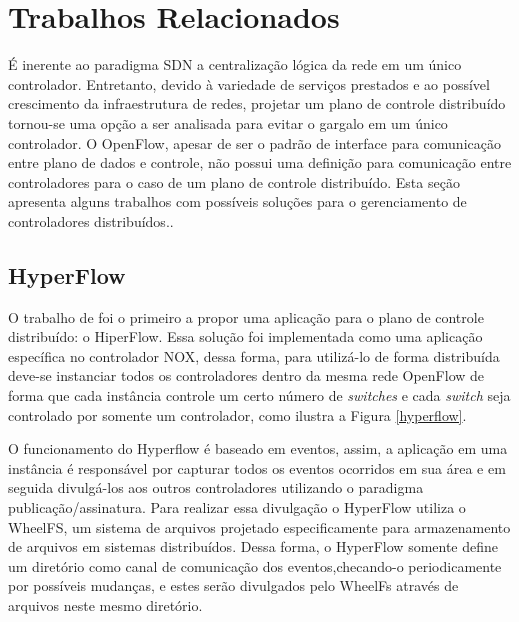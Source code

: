 \chapter{Trabalhos Relacionados}

É inerente ao paradigma SDN a centralização lógica da rede em um único controlador. Entretanto, devido à variedade de serviços prestados e ao possível crescimento da infraestrutura de redes, projetar um plano de controle distribuído tornou-se uma opção a ser analisada para evitar o gargalo em um único controlador. O OpenFlow, apesar de ser o padrão de interface para comunicação entre plano de dados e controle, não possui uma definição para comunicação entre controladores para o caso de um plano de controle distribuído. Esta seção apresenta alguns trabalhos com possíveis soluções para o gerenciamento de controladores distribuídos..

\section{HyperFlow}

O trabalho de  foi o primeiro a propor uma aplicação para o plano de controle distribuído: o HiperFlow. Essa solução foi implementada como uma aplicação específica no controlador NOX, dessa forma, para utilizá-lo de forma distribuída deve-se instanciar todos os controladores dentro da mesma rede OpenFlow de forma que  cada instância controle um certo número de \emph{switches} e cada \emph{switch} seja controlado por somente um controlador, como ilustra a Figura \ref{hyperflow}.
\par O funcionamento do Hyperflow é baseado em eventos, assim, a aplicação em uma instância é responsável por capturar todos os eventos ocorridos em sua área e em seguida divulgá-los aos outros controladores utilizando o paradigma publicação/assinatura. Para realizar essa divulgação o HyperFlow utiliza o WheelFS\cite{Stribling}, um sistema de arquivos projetado especificamente para armazenamento de arquivos em sistemas distribuídos. Dessa forma, o HyperFlow somente define um diretório como canal de comunicação dos eventos,checando-o periodicamente por possíveis mudanças, e estes serão divulgados pelo WheelFs através de arquivos neste mesmo diretório. 


